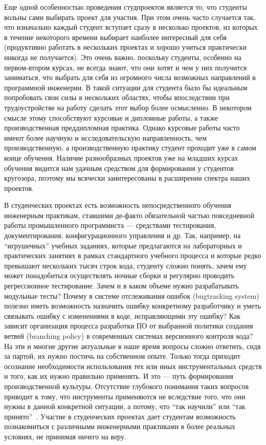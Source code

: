 \documentclass[a4paper]{article}
\begin{document}
Еще одной особенностью проведения студпроектов является то, что студенты вольны сами выбирать проект для участия. При этом очень часто случается так, что изначально каждый студент вступает сразу в несколько проектов, из которых в течение некоторого времени выбирает наиболее интересный для себя (продуктивно работать в нескольких проектах и хорошо учиться практически никогда не получается). Это очень важно, поскольку студенты, особенно на первом-втором курсах, не всегда знают, что они хотят и чем у них получится заниматься, что выбрать для себя из огромного числа возможных направлений в программной инженерии. В такой ситуации для студента было бы идеальным попробовать свои силы в нескольких областях, чтобы впоследствии при трудоустройстве на работу сделать этот выбор более осмысленно. В некотором смысле этому способствуют курсовые и дипломные работы, а также производственная преддипломная практика. Однако курсовые работы часто имеют более научную и  исследовательскую направленность, чем производственную, а производственную практику студент проходит уже в самом конце обучения. Наличие разнообразных проектов уже на младших курсах обучения видится нам удачным средством для формирования у студентов кругозора, поэтому мы всячески заинтересованы в расширении спектра наших проектов. 

В студенческих проектах есть возможность непосредственного обучения инженерным практикам, ставшими де-факто обязательной частью повседневной работы промышленного программиста --- средствами тестирования, документирования, конфигурационного управления и др. Так, например, на ``игрушечных'' учебных заданиях, которые предлагаются на лабораторных и практических занятиях в рамках стандартного учебного процесса и которые редко превышают нескольких тысяч строк кода, студенту сложно понять, зачем ему может понадобиться осуществлять ночные сборки и регулярно проводить регрессионное тестирование. Зачем и в каком объеме нужно разрабатывать модульные тесты? Почему в системе отслеживания ошибок (bugtracking system) полезно иметь возможность назначить ошибку конкретному разработчику и уметь связывать ошибку с изменениями в коде, исправляющими эту ошибку? Как зависит организация процесса разработки ПО от выбранной политики создания ветвей (branching policy) в современных системах версионного контроля кода? На эти и многие другие актуальные в наше время вопросы сложно ответить, сидя за партой, их нужно постичь на собственном опыте. Только тогда приходит осознание необходимости использования тех или иных инструментальных средств и того, как их нужно правильно применять. И это --- путь формирования производственной культуры. Отсутствие глубокого понимания таких вопросов приводит к тому, что инструменты применяются не вследствие того, что они нужны в данной конкретной ситуации, а потому, что ``так научили'' или ``так принято''~\cite{cargoCult}. Участие в студенческих проектах дает студентам возможность познакомиться с различными инженерными практиками в более реальных условиях, не принимая ничего на веру. 
\end{document}
